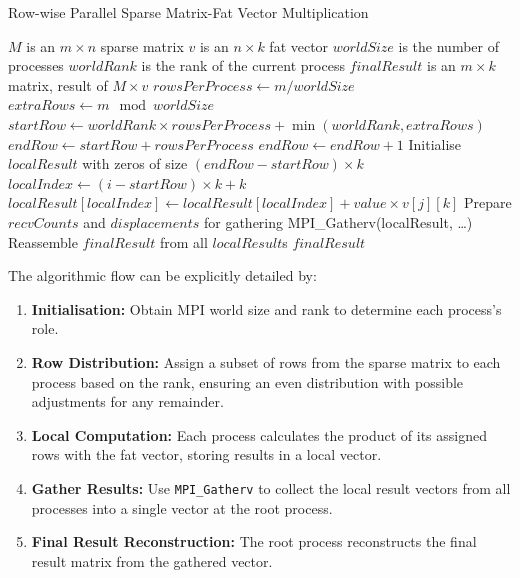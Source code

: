 \documentclass[12pt,oneside]{book} %
\begin{document}
\begin{algorithm}[H]
    \caption{Row-wise Parallel Sparse Matrix-Fat Vector Multiplication}
    \begin{algorithmic}
        \Require $M$ is an $m \times n$ sparse matrix
        \Require $v$ is an $n \times k$ fat vector
        \Require $worldSize$ is the number of processes
        \Require $worldRank$ is the rank of the current process
        \Ensure  $finalResult$ is an $m \times k$ matrix, result of $M \times v$
        \State $rowsPerProcess \gets m / worldSize$
        \State $extraRows \gets m \mod worldSize$
        \State $startRow \gets worldRank \times rowsPerProcess + \min(worldRank, extraRows)$
        \State $endRow \gets startRow + rowsPerProcess$
        \State $endRow \gets endRow + 1$
        \EndIf
        \State Initialise $localResult$ with zeros of size $(endRow - startRow) \times k$
        \State $localIndex \gets (i - startRow) \times k + k$
        \State $localResult[localIndex] \gets localResult[localIndex] + value \times v[j][k]$
        \EndFor
        \EndFor
        \EndFor
        \State Prepare $recvCounts$ and $displacements$ for gathering
        \EndIf
        \State MPI\_Gatherv(localResult, \ldots)
        \State Reassemble $finalResult$ from all $localResult$s
        \State \Return $finalResult$
        \EndIf
    \end{algorithmic}
\end{algorithm}

The algorithmic flow can be explicitly detailed by:
\begin{enumerate}
    \item \textbf{Initialisation:} Obtain MPI world size and rank to determine each process's role.
    \item \textbf{Row Distribution:} Assign a subset of rows from the sparse matrix to each process based on the rank, ensuring an even distribution with possible adjustments for any remainder.
    \item \textbf{Local Computation:} Each process calculates the product of its assigned rows with the fat vector, storing results in a local vector.
    \item \textbf{Gather Results:} Use \texttt{MPI\_Gatherv} to collect the local result vectors from all processes into a single vector at the root process.
    \item \textbf{Final Result Reconstruction:} The root process reconstructs the final result matrix from the gathered vector.
\end{enumerate}
\end{document}
